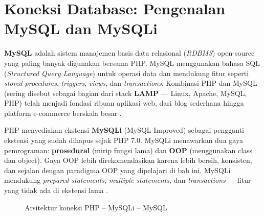 \section{Koneksi Database: Pengenalan MySQL dan MySQLi}

\textbf{MySQL} adalah sistem manajemen basis data relasional (\textit{RDBMS}) open-source yang paling banyak digunakan bersama PHP. MySQL menggunakan bahasa SQL (\textit{Structured Query Language}) untuk operasi data dan mendukung fitur seperti \textit{stored procedures}, \textit{triggers}, \textit{views}, dan \textit{transactions}. Kombinasi PHP dan MySQL (sering disebut sebagai bagian dari stack \textbf{LAMP} --- Linux, Apache, MySQL, PHP) telah menjadi fondasi ribuan aplikasi web, dari blog sederhana hingga platform e-commerce berskala besar \cite{mysqlDocs}.

PHP menyediakan ekstensi \textbf{MySQLi} (MySQL Improved) sebagai pengganti ekstensi  yang sudah dihapus sejak PHP 7.0. MySQLi menawarkan dua gaya pemrograman: \textbf{prosedural} (mirip fungsi lama) dan \textbf{OOP} (menggunakan class dan object). Gaya OOP lebih direkomendasikan karena lebih bersih, konsisten, dan sejalan dengan paradigma OOP yang dipelajari di bab ini. MySQLi mendukung \textit{prepared statements}, \textit{multiple statements}, dan \textit{transactions} --- fitur yang tidak ada di ekstensi lama \cite{phpManual}.

\begin{figure}[ht]
\centering
{}
\caption{Arsitektur koneksi PHP -- MySQLi -- MySQL}
\end{figure}

